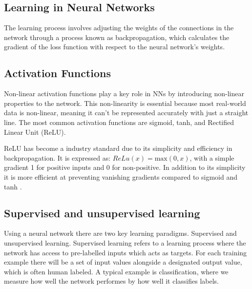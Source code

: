 \subsection{Learning in Neural Networks}
The learning process involves adjusting the weights of the connections in the network through a process known as backpropagation, which calculates the gradient of the loss function with respect to the neural network's weights.


\subsection{Activation Functions}
Non-linear activation functions play a key role in NNs by introducing non-linear properties to the network. This non-linearity is essential because most real-world data is non-linear, meaning it can't be represented accurately with just a straight line.
The most common activation functions are sigmoid, tanh, and Rectified Linear Unit (ReLU).


ReLU has become a industry standard due to its simplicity and efficiency in backpropagation. It is expressed as: $ReLu(x) = \text{max}(0, x)$, with a simple gradient 1 for positive inputs and 0 for non-positive. 
In addition to its simplicity it is more efficient at preventing vanishing gradients compared to sigmoid and tanh \cite{ReLuGrad}. 

\subsection{Supervised and unsupervised learning}
Using a neural network  there are two key learning paradigms. Supervised and unsupervised learning. Supervised learning refers to a learning process where the network has access to pre-labelled inputs which acts as targets.
For each training example there will be a set of input values alongside a designated output value, which is often human labeled.
A typical example is classification, where we measure how well the network performes by how well it classifies labels.

